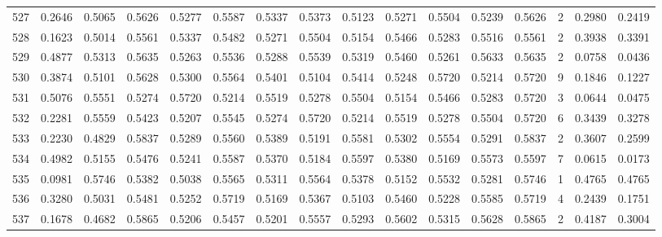 \begin{tabular}{lrrrrrrrrrrrrrrr}
527 &      0.2646 &  0.5065 &  0.5626 &  0.5277 &  0.5587 &  0.5337 &  0.5373 &  0.5123 &  0.5271 &  0.5504 &   0.5239 &     0.5626 &      2 &                    0.2980 &                     0.2419 \\
528 &      0.1623 &  0.5014 &  0.5561 &  0.5337 &  0.5482 &  0.5271 &  0.5504 &  0.5154 &  0.5466 &  0.5283 &   0.5516 &     0.5561 &      2 &                    0.3938 &                     0.3391 \\
529 &      0.4877 &  0.5313 &  0.5635 &  0.5263 &  0.5536 &  0.5288 &  0.5539 &  0.5319 &  0.5460 &  0.5261 &   0.5633 &     0.5635 &      2 &                    0.0758 &                     0.0436 \\
530 &      0.3874 &  0.5101 &  0.5628 &  0.5300 &  0.5564 &  0.5401 &  0.5104 &  0.5414 &  0.5248 &  0.5720 &   0.5214 &     0.5720 &      9 &                    0.1846 &                     0.1227 \\
531 &      0.5076 &  0.5551 &  0.5274 &  0.5720 &  0.5214 &  0.5519 &  0.5278 &  0.5504 &  0.5154 &  0.5466 &   0.5283 &     0.5720 &      3 &                    0.0644 &                     0.0475 \\
532 &      0.2281 &  0.5559 &  0.5423 &  0.5207 &  0.5545 &  0.5274 &  0.5720 &  0.5214 &  0.5519 &  0.5278 &   0.5504 &     0.5720 &      6 &                    0.3439 &                     0.3278 \\
533 &      0.2230 &  0.4829 &  0.5837 &  0.5289 &  0.5560 &  0.5389 &  0.5191 &  0.5581 &  0.5302 &  0.5554 &   0.5291 &     0.5837 &      2 &                    0.3607 &                     0.2599 \\
534 &      0.4982 &  0.5155 &  0.5476 &  0.5241 &  0.5587 &  0.5370 &  0.5184 &  0.5597 &  0.5380 &  0.5169 &   0.5573 &     0.5597 &      7 &                    0.0615 &                     0.0173 \\
535 &      0.0981 &  0.5746 &  0.5382 &  0.5038 &  0.5565 &  0.5311 &  0.5564 &  0.5378 &  0.5152 &  0.5532 &   0.5281 &     0.5746 &      1 &                    0.4765 &                     0.4765 \\
536 &      0.3280 &  0.5031 &  0.5481 &  0.5252 &  0.5719 &  0.5169 &  0.5367 &  0.5103 &  0.5460 &  0.5228 &   0.5585 &     0.5719 &      4 &                    0.2439 &                     0.1751 \\
537 &      0.1678 &  0.4682 &  0.5865 &  0.5206 &  0.5457 &  0.5201 &  0.5557 &  0.5293 &  0.5602 &  0.5315 &   0.5628 &     0.5865 &      2 &                    0.4187 &                     0.3004 \\

\end{tabular}
